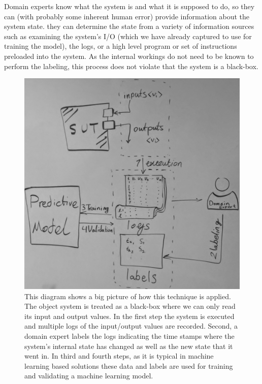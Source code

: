 Domain experts know what the system is and what it is supposed to do, so they can (with probably some inherent human error) provide information about the system state. 
they can determine the state from a variety of information sources such as examining the system's I/O (which we have already captured to use for training the model), the logs, or a high level program or set of instructions preloaded into the system.
As the internal workings do not need to be known to perform the labeling, this process does not violate that the system is a black-box.


\begin{figure}[ht]
    \centering
    \includegraphics[width=\columnwidth]{Sections/process_diagram.jpg}
    \caption{This diagram shows a big picture of how this technique is applied. The object system is treated as a black-box where we can only read its input and output values. In the first step the system is executed and multiple logs of the input/output values are recorded. Second, a domain expert labels the logs indicating the time stamps where the system's internal state has changed as well as the new state that it went in. In third and fourth steps, as it is typical in machine learning based solutions these data and labels are used for training and validating a machine learning model.}
    \label{fig:process_diagram}
\end{figure}

